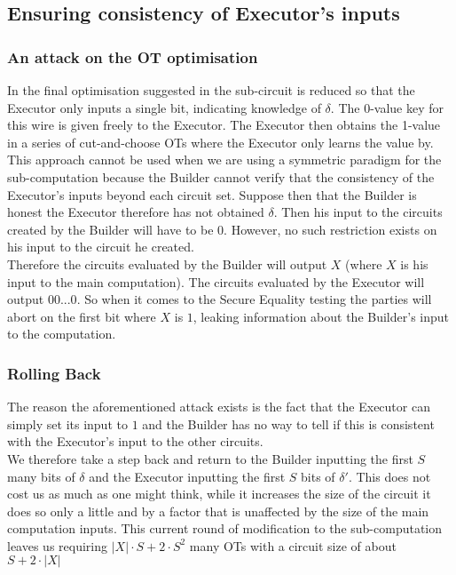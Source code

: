 \documentclass[ %
                    author={Nicholas Tutte},
                supervisor={Prof. Nigel Smart},
                    degree={MEng},
                     title={Secure Two Party Computation},
                  subtitle={A practical comparison of recent protocols},
                      type={Research - GG1K},
                      year={2015} ]{dissertation}
\begin{document}
			\subsection{Ensuring consistency of Executor's inputs}
				\subsubsection{An attack on the OT optimisation}
					In the final optimisation suggested in \cite{Lindell_CnC_2013} the sub-circuit is reduced so that the Executor only inputs a single bit, indicating knowledge of $\delta$. The 0-value key for this wire is given freely to the Executor. The Executor then obtains the 1-value in a series of cut-and-choose OTs where the Executor only learns the value by.\\

					This approach cannot be used when we are using a symmetric paradigm for the sub-computation because the Builder cannot verify that the consistency of the Executor's inputs beyond each circuit set. Suppose then that the Builder is honest the Executor therefore has not obtained $\delta$. Then his input to the circuits created by the Builder will have to be $0$. However, no such restriction exists on his input to the circuit he created.\\

					Therefore the circuits evaluated by the Builder will output $X$ (where $X$ is his input to the main computation). The circuits evaluated by the Executor will output $00...0$. So when it comes to the Secure Equality testing the parties will abort on the first bit where $X$ is $1$, leaking information about the Builder's input to the computation.\\

				\subsubsection{Rolling Back}
					The reason the aforementioned attack exists is the fact that the Executor can simply set its input to $1$ and the Builder has no way to tell if this is consistent with the Executor's input to the other circuits.\\

					We therefore take a step back and return to the Builder inputting the first $S$ many bits of $\delta$ and the Executor inputting the first $S$ bits of $\delta'$. This does not cost us as much as one might think, while it increases the size of the circuit it does so only a little and by a factor that is unaffected by the size of the main computation inputs. This current round of modification to the sub-computation leaves us requiring $|X| \cdot S + 2 \cdot S^2$ many OTs with a circuit size of about $S + 2 \cdot |X|$\\
\end{document}
